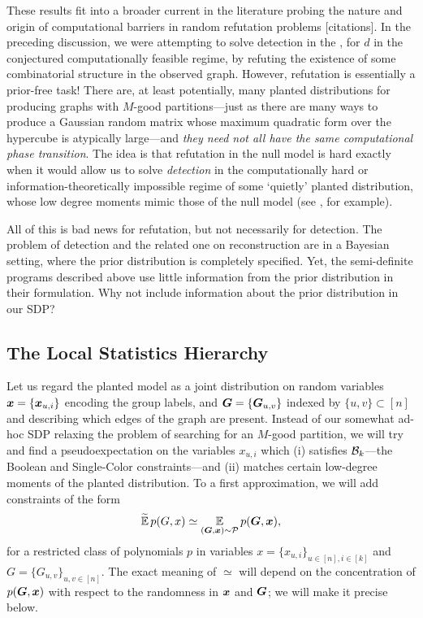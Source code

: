 These results fit into a broader current in the literature probing the nature and origin of computational barriers in random refutation problems [citations]. In the preceding discussion, we were attempting to solve detection in the \model, for $d$ in the conjectured computationally feasible regime, by refuting the existence of some combinatorial structure in the observed graph. However, refutation is essentially a prior-free task! 
There are, at least potentially, many planted distributions for producing graphs with $M$-good partitions---just as there are many ways to produce a Gaussian random matrix whose maximum quadratic form over the hypercube is atypically large---and \emph{they need not all have the same computational phase transition}. The idea is that refutation in the null model is hard exactly when it would allow us to solve \emph{detection} in the computationally hard or information-theoretically impossible regime of some `quietly' planted distribution, whose low degree moments mimic those of the null model (see \cite{bandeira2019computational}, for example).

All of this is bad news for refutation, but not necessarily for detection. The problem of detection and the related one on reconstruction are in a Bayesian setting, where the prior distribution is completely specified. Yet, the semi-definite programs described above use little information from the prior distribution in their formulation.  Why not include information about the prior distribution in our SDP?



\subsection{The Local Statistics Hierarchy} %
\label{sub:the_local_statistics_hierarchy}

Let us regard the planted model as a joint distribution on random variables ${\boldsymbol{x}} = \{{\boldsymbol{x}}_{u,i}\}$ encoding the group labels, and $\boldsymbol{G} = \{\boldsymbol{G}_{u,v}\}$ indexed by $\{u,v\} \subset [n]$ and describing which edges of the graph are present.  Instead of our somewhat ad-hoc SDP relaxing the problem of searching for an $M$-good partition, we will try and find a pseudoexpectation on the variables $x_{u,i}$ which (i) satisfies $\mathcal{B}_k$---the Boolean and Single-Color constraints---and (ii) matches certain low-degree moments of the planted distribution. To a first approximation, we will add constraints of the form
$$
	\widetilde{\operatorname*{\mathbb{E}}}\, p(G,x) \simeq \operatorname*{\mathbb{E}}_{(\boldsymbol{G},{\boldsymbol{x}})\sim \mathcal{P}} p(\boldsymbol{G},{\boldsymbol{x}}),
$$
for a restricted class of polynomials $p$ in variables $x = \{x_{u,i}\}_{u\in [n], i \in [k]}$ and $G = \{G_{u,v}\}_{u,v\in[n]}$. The exact meaning of $\simeq$ will depend on the concentration of $p(\boldsymbol{G},{\boldsymbol{x}})$ with respect to the randomness in ${\boldsymbol{x}}$ and $\boldsymbol{G}$; we will make it precise below.


